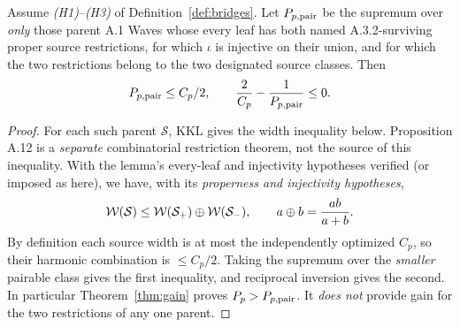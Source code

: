 \begin{proposition}
\label{prop:loss}
Assume \emph{(H1)}--\emph{(H3)} of
Definition~\ref{def:bridges}.
Let $P_{p,\mathrm{pair}}$ be the
supremum over \emph{only}
those parent A.1 Waves
whose every leaf has both
named A.3.2-surviving
proper source restrictions,
for which $\iota$ is injective
on their union, and for
which the two restrictions
belong to the two
designated source classes.
Then
\[
 P_{p,\mathrm{pair}}\le C_p/2,\qquad
 \frac2{C_p}-\frac1{P_{p,\mathrm{pair}}}\le0.
\]
\end{proposition}
\begin{proof}
For each such parent
$\mathcal S$, KKL
\cite[Lemma A.11]{KKL2026}
gives the width inequality below.
Proposition A.12 is a \emph{separate}
combinatorial restriction theorem,
not the source of this inequality.
With the lemma's every-leaf and
injectivity hypotheses verified
(or imposed as here), we have, with its
\emph{properness and
injectivity hypotheses},
\[
 \mathcal W(\mathcal S)\le
 \mathcal W(\mathcal S_+)\oplus\mathcal W(\mathcal S_-),
 \qquad a\oplus b=\frac{ab}{a+b}.
\]
By definition each
source width is at most
the independently optimized
$C_p$, so their harmonic
combination is $\le C_p/2$.
Taking the supremum over
the \emph{smaller}
pairable class gives
the first inequality,
and reciprocal inversion
gives the second.
In particular
Theorem~\ref{thm:gain}
proves $P_p>P_{p,\mathrm{pair}}$.
It \emph{does not}
provide gain for
the two restrictions
of any one parent.
\end{proof}

